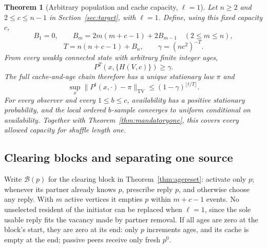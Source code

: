 \documentclass[11pt]{article}
\newtheorem{theorem}{Theorem}
\newcommand{\TV}{\mathrm{TV}}
\begin{document}
\begin{theorem}[Arbitrary population and cache capacity, $\ell=1$]
\label{thm:generalone}
Let $n\ge2$ and $2\le c\le n-1$ in
Section~\ref{sec:target}, with $\ell=1$.
Define, using this fixed capacity $c$,
\[
 B_1=0,\qquad B_m=2m(m+c-1)+2B_{m-1}\quad(2\le m\le n),
\]
\[
 T=n(n+c-1)+B_n,\qquad \gamma=(nc^2)^{-T}.
\]
From every weakly connected state with arbitrary finite integer ages,
\[
 P^T(x,\{H(V,c)\})\ge\gamma .
\]
The full cache-and-age chain therefore has a unique stationary
law $\pi$ and
\[
 \sup_x\|P^t(x,\cdot)-\pi\|_{\TV}
 \le(1-\gamma)^{\lfloor t/T\rfloor}.
\]
For every observer and every $1\le b\le c$, availability has a
positive stationary probability, and the local ordered $b$-sample
converges to uniform conditional on availability.
Together with Theorem~\ref{thm:mandatoryone}, this covers every
allowed capacity for shuffle length one.
\end{theorem}

\subsection{Clearing blocks and separating one source}

Write $\mathcal B(p)$ for the clearing block in
Theorem~\ref{thm:agereset}: activate only $p$; whenever its partner
already knows $p$, prescribe reply $p$, and otherwise choose any
reply. With $m$ active vertices it empties $p$ within $m+c-1$
events. No unselected resident of the initiator can be replaced
when $\ell=1$, since the sole usable reply fits the vacancy made
by partner removal. If all ages are zero at the block's start,
they are zero at its end: only $p$ increments ages, and its cache
is empty at the end; passive peers receive only fresh $p^0$.
\end{document}
